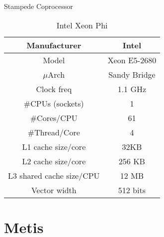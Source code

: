 \documentclass{beamer}
\begin{document}

\begin{frame}{Stampede Coprocessor}
\begin{table}[H]
\centering
\footnotesize
\begin{tabular}{| c | c |}\hline
Manufacturer & Intel\\ \hline
Model & Xeon E5-2680\\ \hline
$\mu$Arch & Sandy Bridge\\ \hline
Clock freq & 1.1 GHz\\ \hline
\#CPUs (sockets) & 1 \\ \hline
\#Cores/CPU & 61\\ \hline
\#Thread/Core & 4\\ \hline
L1 cache size/core & 32KB\\ \hline
L2 cache size/core & 256 KB\\ \hline
L3 shared cache size/CPU & 12 MB\\ \hline
Vector width & 512 bits\\ \hline
\end{tabular}
\caption{Intel Xeon Phi}
\end{table}
\end{frame}


\section{Metis}

\begin{frame}
\end{frame}


\end{document}
